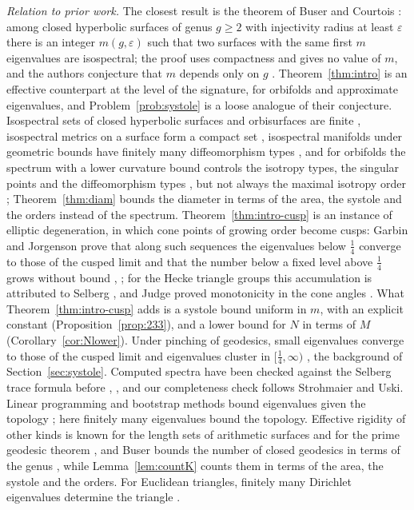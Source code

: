 \documentclass[pdflatex,sn-mathphys-num]{sn-jnl}
\theoremstyle{thmstyleone}%
\theoremstyle{thmstylethree}%
\begin{document}
\emph{Relation to prior work.} The closest result is the theorem of Buser and Courtois \cite[(1.1)]{busercourtois1990}: among closed hyperbolic surfaces of genus $g\ge2$ with injectivity radius at least $\varepsilon$ there is an integer $m(g,\varepsilon)$ such that two surfaces with the same first $m$ eigenvalues are isospectral; the proof uses compactness and gives no value of $m$, and the authors conjecture that $m$ depends only on $g$ \cite[pp.~523--524]{busercourtois1990}. Theorem~\ref{thm:intro} is an effective counterpart at the level of the signature, for orbifolds and approximate eigenvalues, and Problem~\ref{prob:systole} is a loose analogue of their conjecture. Isospectral sets of closed hyperbolic surfaces and orbisurfaces are finite \cite{mckean1972,dryden2004}, isospectral metrics on a surface form a compact set \cite{ops1988}, isospectral manifolds under geometric bounds have finitely many diffeomorphism types \cite{bpp1992}, and for orbifolds the spectrum with a lower curvature bound controls the isotropy types, the singular points and the diffeomorphism types \cite{stanhope2005,proctorstanhope2010}, but not always the maximal isotropy order \cite{rsw2008}; Theorem~\ref{thm:diam} bounds the diameter in terms of the area, the systole and the orders instead of the spectrum. Theorem~\ref{thm:intro-cusp} is an instance of elliptic degeneration, in which cone points of growing order become cusps: Garbin and Jorgenson prove that along such sequences the eigenvalues below $\frac14$ converge to those of the cusped limit and that the number below a fixed level above $\frac14$ grows without bound \cite[Cor.~5.5, Thm~5.7]{garbinjorgenson2018}, \cite[Thm~6.5]{garbinjorgenson2020}; for the Hecke triangle groups this accumulation is attributed to Selberg \cite[p.~579]{hejhal1983}, and Judge proved monotonicity in the cone angles \cite{judge1995}. What Theorem~\ref{thm:intro-cusp} adds is a systole bound uniform in $m$, with an explicit constant (Proposition~\ref{prop:233}), and a lower bound for $N$ in terms of $M$ (Corollary~\ref{cor:Nlower}). Under pinching of geodesics, small eigenvalues converge to those of the cusped limit and eigenvalues cluster in $[\frac14,\infty)$ \cite{hejhal1990,ji1993,wolpert1992a,wolpert1992b}, the background of Section~\ref{sec:systole}. Computed spectra have been checked against the Selberg trace formula before \cite[\S7]{strohmaieruski2013}, \cite{bsv2006}, and our completeness check follows Strohmaier and Uski. Linear programming and bootstrap methods bound eigenvalues given the topology \cite{fortierbourquepetri2023,bonifacio2022,kmp2024}; here finitely many eigenvalues bound the topology. Effective rigidity of other kinds is known for the length sets of arithmetic surfaces \cite{lmpt2018} and for the prime geodesic theorem \cite{fjk2011}, and Buser bounds the number of closed geodesics in terms of the genus \cite[Lemma~6.6.4]{buser1992}, while Lemma~\ref{lem:countK} counts them in terms of the area, the systole and the orders. For Euclidean triangles, finitely many Dirichlet eigenvalues determine the triangle \cite[Thm~1]{changdeturck1989}.
\end{document}
